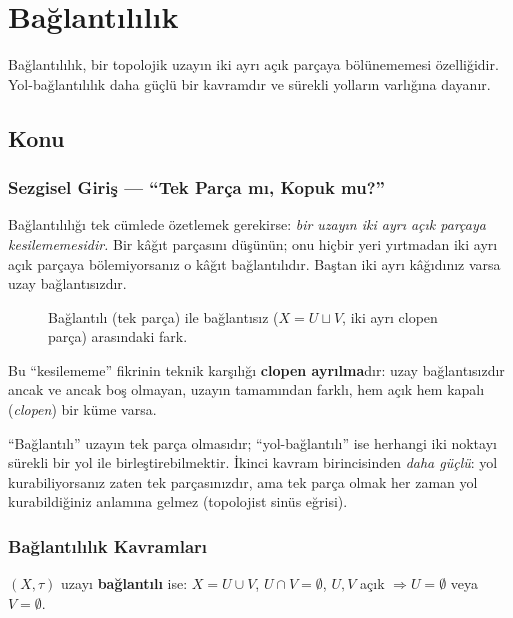 \chapter{Bağlantılılık}

Bağlantılılık, bir topolojik uzayın iki ayrı açık parçaya bölünememesi özelliğidir.
Yol-bağlantılılık daha güçlü bir kavramdır ve sürekli yolların varlığına dayanır.

\section{Konu}

\subsection{Sezgisel Giriş — ``Tek Parça mı, Kopuk mu?''}

Bağlantılılığı tek cümlede özetlemek gerekirse: \emph{bir uzayın iki ayrı açık
parçaya kesilememesidir.} Bir kâğıt parçasını düşünün; onu hiçbir yeri yırtmadan
iki ayrı açık parçaya bölemiyorsanız o kâğıt bağlantılıdır. Baştan iki ayrı
kâğıdınız varsa uzay bağlantısızdır.

\begin{figure}[ht]
  \centering
  
  \caption{Bağlantılı (tek parça) ile bağlantısız ($X = U \sqcup V$, iki ayrı
    clopen parça) arasındaki fark.}
\end{figure}

Bu ``kesilememe'' fikrinin teknik karşılığı \textbf{clopen ayrılma}dır: uzay
bağlantısızdır ancak ve ancak boş olmayan, uzayın tamamından farklı, hem açık hem
kapalı (\emph{clopen}) bir küme varsa.

\begin{sezgi}
``Bağlantılı'' uzayın tek parça olmasıdır; ``yol-bağlantılı'' ise herhangi iki
noktayı sürekli bir yol ile birleştirebilmektir. İkinci kavram birincisinden
\emph{daha güçlü}: yol kurabiliyorsanız zaten tek parçasınızdır, ama tek parça
olmak her zaman yol kurabildiğiniz anlamına gelmez (topolojist sinüs eğrisi).
\end{sezgi}

\subsection{Bağlantılılık Kavramları}

\begin{definition}
$(X, \tau)$ uzayı \textbf{bağlantılı} ise: $X = U \cup V$, $U \cap V = \emptyset$,
$U,V$ açık $\Rightarrow U = \emptyset$ veya $V = \emptyset$.
\end{definition}

